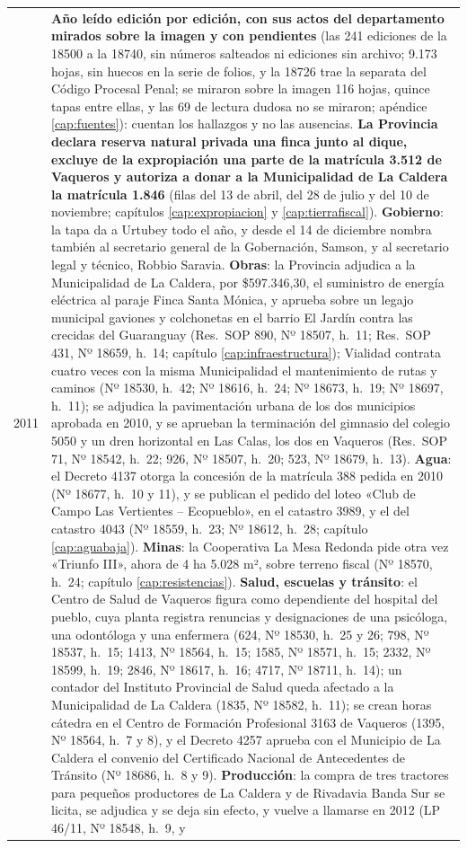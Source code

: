 \begin{longtable}{@{}p{2.7cm}p{10.3cm}@{}}
2011 & \textbf{Año leído edición por edición, con sus actos del departamento mirados sobre la imagen y con pendientes} (las 241 ediciones de la 18500 a la 18740, sin números salteados ni ediciones sin archivo; 9.173 hojas, sin huecos en la serie de folios, y la 18726 trae la separata del Código Procesal Penal; se miraron sobre la imagen 116 hojas, quince tapas entre ellas, y las 69 de lectura dudosa no se miraron; apéndice \ref{cap:fuentes}): cuentan los hallazgos y no las ausencias. \textbf{La Provincia declara reserva natural privada una finca junto al dique, excluye de la expropiación una parte de la matrícula 3.512 de Vaqueros y autoriza a donar a la Municipalidad de La Caldera la matrícula 1.846} (filas del 13 de abril, del 28 de julio y del 10 de noviembre; capítulos \ref{cap:expropiacion} y \ref{cap:tierrafiscal}). \textbf{Gobierno}: la tapa da a Urtubey todo el año, y desde el 14 de diciembre nombra también al secretario general de la Gobernación, Samson, y al secretario legal y técnico, Robbio Saravia. \textbf{Obras}: la Provincia adjudica a la Municipalidad de La Caldera, por \$597.346,30, el suministro de energía eléctrica al paraje Finca Santa Mónica, y aprueba sobre un legajo municipal gaviones y colchonetas en el barrio El Jardín contra las crecidas del Guaranguay (Res.\ SOP 890, Nº 18507, h.\ 11; Res.\ SOP 431, Nº 18659, h.\ 14; capítulo \ref{cap:infraestructura}); Vialidad contrata cuatro veces con la misma Municipalidad el mantenimiento de rutas y caminos (Nº 18530, h.\ 42; Nº 18616, h.\ 24; Nº 18673, h.\ 19; Nº 18697, h.\ 11); se adjudica la pavimentación urbana de los dos municipios aprobada en 2010, y se aprueban la terminación del gimnasio del colegio 5050 y un dren horizontal en Las Calas, los dos en Vaqueros (Res.\ SOP 71, Nº 18542, h.\ 22; 926, Nº 18507, h.\ 20; 523, Nº 18679, h.\ 13). \textbf{Agua}: el Decreto 4137 otorga la concesión de la matrícula 388 pedida en 2010 (Nº 18677, h.\ 10 y 11), y se publican el pedido del loteo «Club de Campo Las Vertientes -- Ecopueblo», en el catastro 3989, y el del catastro 4043 (Nº 18559, h.\ 23; Nº 18612, h.\ 28; capítulo \ref{cap:aguabaja}). \textbf{Minas}: la Cooperativa La Mesa Redonda pide otra vez «Triunfo III», ahora de 4 ha 5.028 m², sobre terreno fiscal (Nº 18570, h.\ 24; capítulo \ref{cap:resistencias}). \textbf{Salud, escuelas y tránsito}: el Centro de Salud de Vaqueros figura como dependiente del hospital del pueblo, cuya planta registra renuncias y designaciones de una psicóloga, una odontóloga y una enfermera (624, Nº 18530, h.\ 25 y 26; 798, Nº 18537, h.\ 15; 1413, Nº 18564, h.\ 15; 1585, Nº 18571, h.\ 15; 2332, Nº 18599, h.\ 19; 2846, Nº 18617, h.\ 16; 4717, Nº 18711, h.\ 14); un contador del Instituto Provincial de Salud queda afectado a la Municipalidad de La Caldera (1835, Nº 18582, h.\ 11); se crean horas cátedra en el Centro de Formación Profesional 3163 de Vaqueros (1395, Nº 18564, h.\ 7 y 8), y el Decreto 4257 aprueba con el Municipio de La Caldera el convenio del Certificado Nacional de Antecedentes de Tránsito (Nº 18686, h.\ 8 y 9). \textbf{Producción}: la compra de tres tractores para pequeños productores de La Caldera y de Rivadavia Banda Sur se licita, se adjudica y se deja sin efecto, y vuelve a llamarse en 2012 (LP 46/11, Nº 18548, h.\ 9, y 
\end{longtable}
